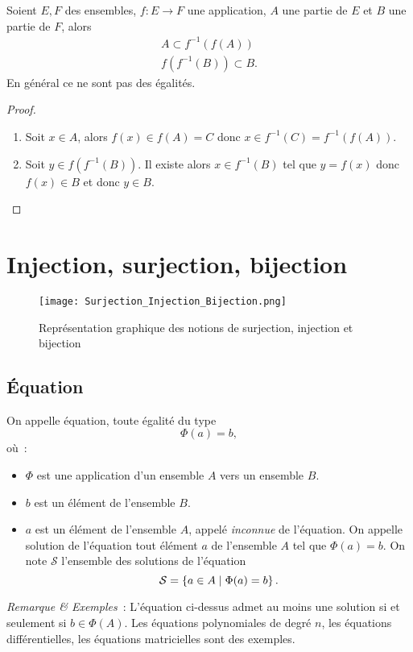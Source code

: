 %
\begin{prop}
  Soient $E,F$ des ensembles, $f:E\longrightarrow F$ une application, $A$ une partie de $E$ et $B$ une partie de $F$, alors
  \begin{gather}
    A \subset f^{-1}(f(A)) \\
    f(f^{-1}(B)) \subset B.
  \end{gather}
  En général ce ne sont pas des égalités.
\end{prop}
\begin{proof}
  \begin{enumerate}
  \item Soit $x \in A$, alors $f(x) \in f(A) = C$ donc $x \in f^{-1}(C)=f^{-1}(f(A))$.
  \item Soit $y \in f(f^{-1}(B))$. Il existe alors $x \in f^{-1}(B)$ tel que $y=f(x)$ donc $f(x) \in B$ et donc $y \in B$.
  \end{enumerate}
\end{proof}
%
\section{Injection, surjection, bijection}
\label{chap3-sec:injsurbij}
%
\begin{figure}
  \centering
  \texttt{[image: Surjection\_Injection\_Bijection.png]}
  \caption[Surjection, injection et bijection]{Représentation graphique des notions de surjection, injection et bijection}
  \label{chap3-fig:surjinjbij}
\end{figure}
%
\subsection{Équation}
\label{chap3-subsec:equation}
\begin{defdef}
  On appelle équation, toute égalité du type
  \begin{equation}
    \Phi(a)=b,
  \end{equation}
  où~:
  \begin{itemize}
  \item $\Phi$ est une application d'un ensemble $A$ vers un ensemble $B$.
  \item $b$ est un élément de l'ensemble $B$.
  \item $a$ est un élément de l'ensemble $A$, appelé \emph{inconnue} de l'équation. On appelle solution de l'équation tout élément $a$ de l'ensemble $A$ tel que $\Phi(a)=b$. On note $\mathcal{S}$ l'ensemble des solutions de l'équation
    \begin{equation}
      \mathcal{S} = \left\{a \in A\mathrel{}\middle|\mathrel{}\Phi(a)=b\right\}.
    \end{equation}
  \end{itemize}
\end{defdef}
\emph{Remarque \& Exemples}~: L'équation ci-dessus admet au moins une solution si et seulement si $b \in \Phi(A)$. Les équations polynomiales de degré $n$, les équations différentielles, les équations matricielles sont des exemples.
%
